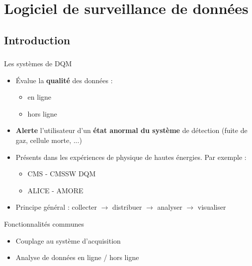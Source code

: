\documentclass[8pt]{beamer}
\begin{document}
  \section{Logiciel de surveillance de données}

  \begin{frame}
  \frametitle{\secname}
    \tableofcontents[currentsection]
  \end{frame}

  \subsection{Introduction}

  \begin{frame}
  \frametitle{\secname}
  \framesubtitle{\subsecname}
  \small
    \begin{block}{Les systèmes de DQM}
      \begin{itemize}
        \item Évalue la \textbf{qualité} des données :
        \begin{itemize}
          \item en ligne
          \item hors ligne
        \end{itemize}
        \item \textbf{Alerte} l'utilisateur d'un \textbf{état anormal du système} de détection (fuite de gaz, cellule morte, ...)
        \item Présents dans les expériences de physique de hautes énergies. Par exemple :
        \begin{itemize}
          \item CMS   - CMSSW DQM
          \item ALICE - AMORE
        \end{itemize}
        \item Principe général : collecter $\rightarrow$ distribuer $\rightarrow$ analyser $\rightarrow$ visualiser
      \end{itemize}
    \end{block}
    \pause
    \begin{minipage}{0.47\linewidth}
      \begin{block}{Fonctionnalités communes}
        \begin{itemize}
          \item Couplage au système d'acquisition
          \item Analyse de données en ligne / hors ligne

\end{itemize}
\end{block}
\end{minipage}
\end{frame}
\end{document}
